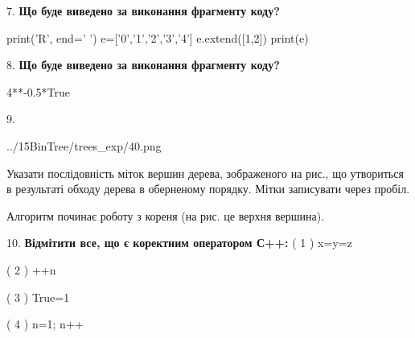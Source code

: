 \documentclass[11pt]{article}
\begin{document}
7. \textbf{Що буде виведено за виконання фрагменту коду?}

print('R', end=' ')
e=['0','1','2','3','4']
e.extend([1,2])
print(e)

\par\vspace{5mm}

8. \textbf{Що буде виведено за виконання фрагменту коду?}

4**-0.5*True
\par\vspace{5mm}

9. 

\begin{center}
	{../15BinTree/trees_exp/40.png}
\end{center}
Указати послідовність міток вершин дерева, зображеного на рис., що утвориться в результаті обходу дерева в оберненому порядку. Мітки записувати через пробіл.\par Алгоритм починає роботу з кореня (на рис. це верхня вершина).
\par\vspace{5mm}

10. %
\textbf{Відмітити все, що є коректним оператором С++:}
( 1 ) x=y=z

( 2 ) ++n

( 3 ) True=1

( 4 ) n=1; n++
\par\vspace{5mm}

\newpage
\end{document}
